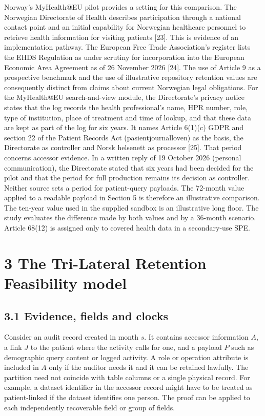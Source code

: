 \documentclass[5p,twocolumn]{elsarticle}
\begin{document}
Norway's MyHealth@EU pilot provides a setting for this comparison. The
Norwegian Directorate of Health describes participation through a
national contact point and an initial capability for Norwegian
healthcare personnel to retrieve health information for visiting
patients {[}23{]}. This is evidence of an implementation pathway. The
European Free Trade Association's register lists the EHDS Regulation as
under scrutiny for incorporation into the European Economic Area
Agreement as of 26 November 2026 {[}24{]}. The use of Article 9 as a
prospective benchmark and the use of illustrative repository retention
values are consequently distinct from claims about current Norwegian
legal obligations. For the MyHealth@EU search-and-view module, the
Directorate's privacy notice states that the log records the health
professional's name, HPR number, role, type of institution, place of
treatment and time of lookup, and that these data are kept as part of
the log for six years. It names Article 6(1)(c) GDPR and section 22 of
the Patient Records Act (pasientjournalloven) as the basis, the
Directorate as controller and Norsk helsenett as processor {[}25{]}.
That period concerns accessor evidence. In a written reply of 19 October
2026 (personal communication), the Directorate stated that six years had
been decided for the pilot and that the period for full production
remains its decision as controller. Neither source sets a period for
patient-query payloads. The 72-month value applied to a readable payload
in Section 5 is therefore an illustrative comparison. The ten-year value
used in the supplied sandbox is an illustrative long floor. The study
evaluates the difference made by both values and by a 36-month scenario.
Article 68(12) is assigned only to covered health data in a
secondary-use SPE.

\hypertarget{the-tri-lateral-retention-feasibility-model}{%
\section{3 The Tri-Lateral Retention Feasibility
model}\label{the-tri-lateral-retention-feasibility-model}}

\hypertarget{evidence-fields-and-clocks}{%
\subsection{3.1 Evidence, fields and
clocks}\label{evidence-fields-and-clocks}}

Consider an audit record created in month \(s\). It contains accessor
information \(A\), a link \(J\) to the patient where the activity calls
for one, and a payload \(P\) such as demographic query content or logged
activity. A role or operation attribute is included in \(A\) only if the
auditor needs it and it can be retained lawfully. The partition need not
coincide with table columns or a single physical record. For example, a
dataset identifier in the accessor record might have to be treated as
patient-linked if the dataset identifies one person. The proof can be
applied to each independently recoverable field or group of fields.
\end{document}
